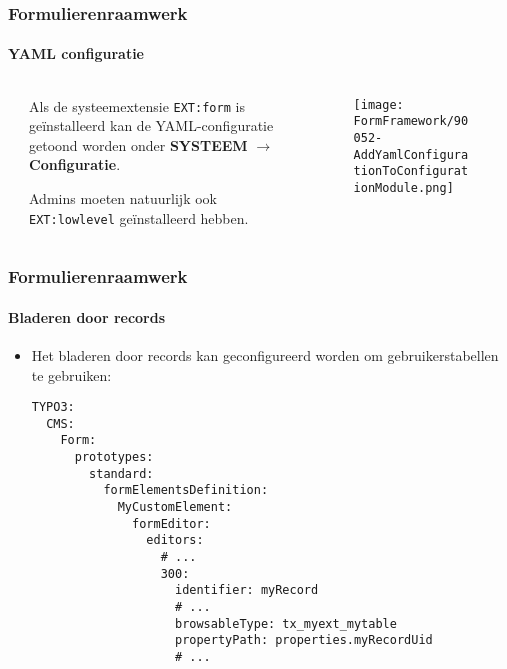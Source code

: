 
\begin{frame}[fragile]
	\frametitle{Formulierenraamwerk}
	\framesubtitle{YAML configuratie}

	\begin{columns}[T]
		\begin{column}{.04\textwidth}
		\end{column}
		\begin{column}{.38\textwidth}

			Als de systeemextensie \texttt{EXT:form} is geïnstalleerd kan de YAML-configuratie
			getoond worden onder \textbf{SYSTEEM} $\rightarrow$ \textbf{Configuratie}.

			\vspace{0.2cm}

			Admins moeten natuurlijk ook \texttt{EXT:lowlevel} geïnstalleerd hebben.

		\end{column}
		\begin{column}{.58\textwidth}
			\vspace{-0.3cm}
			\begin{figure}
				\texttt{[image: FormFramework/90052-AddYamlConfigurationToConfigurationModule.png]}
			\end{figure}
		\end{column}
	\end{columns}

\end{frame}


\begin{frame}[fragile]
	\frametitle{Formulierenraamwerk}
	\framesubtitle{Bladeren door records}

	\lstset{basicstyle=\tiny\ttfamily}

	\begin{itemize}
		\item Het bladeren door records kan geconfigureerd worden om gebruikerstabellen te gebruiken:
\begin{lstlisting}
TYPO3:
  CMS:
    Form:
      prototypes:
        standard:
          formElementsDefinition:
            MyCustomElement:
              formEditor:
                editors:
                  # ...
                  300:
                    identifier: myRecord
                    # ...
                    browsableType: tx_myext_mytable
                    propertyPath: properties.myRecordUid
                    # ...
\end{lstlisting}

	\end{itemize}

\end{frame}

